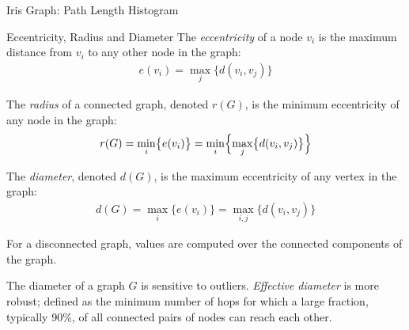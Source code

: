 \begin{frame}{Iris Graph: Path Length Histogram}
    \begin{center}
    \end{center}
\end{frame}

\ifdefined\wox \begin{frame} \titlepage \end{frame} \fi

\begin{frame}{Eccentricity, Radius and Diameter}
The {\em eccentricity} of a node $v_i$ is the maximum distance
from $v_i$ to any other node in the graph:
\begin{align*}
e(v_i) = \max_{j} \bigl\{ d(v_i, v_{j}) \bigr\}
\end{align*}

\medskip
The {\em radius} of a connected
graph, denoted $r(G)$, is the minimum eccentricity of any node in
the graph:
\begin{align*}
r(G) = \min_{i} \bigl\{ e(v_i) \bigr\} =
\min_i \Bigl\{\max_{j} \bigl \{ d(v_i, v_{j}) \bigr\} \Bigr\}
\end{align*}

\medskip
The {\em diameter},
denoted $d(G)$, is the maximum eccentricity of any vertex in the
graph:
\begin{align*}
d(G) = \max_{i} \bigl\{ e(v_i) \bigr\} = \max_{i,j} \bigl\{
d(v_i, v_{j})\bigr\}
\end{align*}

For a disconnected graph, values are
computed over the connected components of the graph.

\medskip
The diameter of a graph $G$ is sensitive to outliers.
{\em Effective diameter} is more robust; def\/{i}ned as the minimum
number of hops for which a large fraction, typically 90\%, of all
connected pairs of nodes can reach each other. 
\end{frame}




